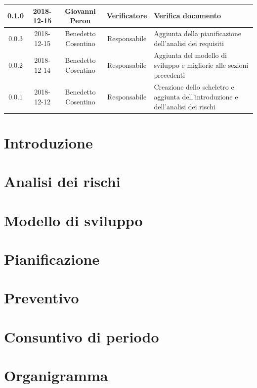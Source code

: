 \documentclass[11pt,a4paper]{article}
\begin{document}
\begin{tabularx}{\textwidth}{ c | c | c | c | X }
		0.1.0 & 2018-12-15 & Giovanni Peron & Verificatore & Verifica documento\\ \hline
		0.0.3 & 2018-12-15 & Benedetto Cosentino & Responsabile & Aggiunta della pianificazione dell'analisi dei requisiti\\ \hline
		0.0.2 & 2018-12-14 & Benedetto Cosentino & Responsabile & Aggiunta del modello di sviluppo e migliorie alle sezioni precedenti\\ \hline
		0.0.1 & 2018-12-12 & Benedetto Cosentino & Responsabile & Creazione dello scheletro e aggiunta dell'introduzione e dell'analisi dei rischi\\ \hline
	\end{tabularx}
	\newpage
	\tableofcontents
	\newpage	
	\section{Introduzione}
			
		\newpage	
	
	\section{Analisi dei rischi}
		
		\newpage	

	\section{Modello di sviluppo}
		
		\newpage	

	\section{Pianificazione}
		
		\newpage
				
	\section{Preventivo}
		
		\newpage
				
	\section{Consuntivo di periodo}
		
		\newpage
		
	\appendix
	\section{Organigramma}
		
\end{document}
